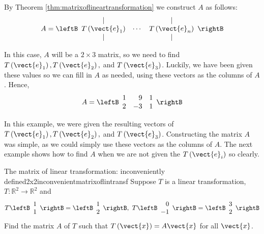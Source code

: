 \begin{solution} By Theorem \ref{thm:matrixoflineartransformation} we construct $A$ as follows:
\begin{equation*}
A = 
\leftB
\begin{array}{ccc}
| &  & | \\
T\left( \vect{e}_{1}\right) & \cdots & T\left( \vect{e}_{n}\right) \\
| &  & |
\end{array}
\rightB
\end{equation*}

In this case, $A$ will be a $2 \times 3$ matrix, so we need to find $T
\left(\vect{e}_1 \right), T \left(\vect{e}_2 \right),$ and $T \left(\vect{e}_3
\right)$. Luckily, we have been given these values so we can fill in
$A$ as needed, using these vectors as the columns of $A$.  Hence,
\begin{equation*}
A=\leftB
\begin{array}{rrr}
1 & 9 & 1 \\
2 & -3 & 1
\end{array}
\rightB
\end{equation*}
\end{solution}

In this example, we were given the resulting vectors of $T \left(\vect{e}_1 \right), 
T \left(\vect{e}_2 \right),$ and $T \left(\vect{e}_3 \right)$. Constructing the matrix $A$ was simple, as we
could simply use these vectors as the columns of $A$. The next example shows how to find $A$ when we are not given the $T \left(\vect{e}_i \right)$ so clearly. 

\begin{example}{The matrix of linear transformation: inconveniently \\ defined}{2x2inconvenientmatrixoflintransf}
Suppose $T$ is a linear transformation, $T:\mathbb{R}^{2}\rightarrow \mathbb{R}^{2}$ and
\begin{equation*}
T\leftB
\begin{array}{r}
1 \\
1
\end{array}
\rightB =\leftB
\begin{array}{r}
1 \\
2
\end{array}
\rightB ,\ T\leftB
\begin{array}{r}
0 \\
-1 
\end{array}
\rightB =\leftB
\begin{array}{r}
3 \\
2
\end{array}
\rightB
\end{equation*}
Find the matrix $A$ of $T$ such that $T \left( \vect{x} \right)=A\vect{x}$  for all $\vect{x}$.
\end{example}

